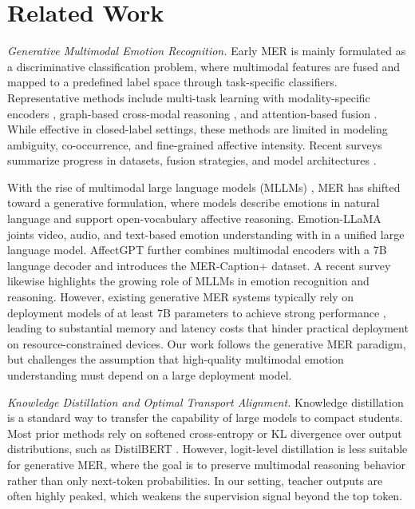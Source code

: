\documentclass[sigconf]{acmart}
\begin{document}
\section{Related Work}
\noindent \emph{Generative Multimodal Emotion Recognition.}
Early MER is mainly formulated as a discriminative classification problem, where multimodal features are fused and mapped to a predefined label space through task-specific classifiers.
Representative methods include multi-task learning with modality-specific encoders \cite{zheng-etal-2023-facial,fu2024iisan}, graph-based cross-modal reasoning \cite{Li_2023}, and attention-based fusion \cite{shi-huang-2023-multiemo}.
While effective in closed-label settings, these methods are limited in modeling ambiguity, co-occurrence, and fine-grained affective intensity.
Recent surveys summarize progress in datasets, fusion strategies, and model architectures \cite{biomimetics10070418, AV2024102218}.

With the rise of multimodal large language models (MLLMs) \cite{openai2024,yang2025,geminiteam2025,fu2025efficient,fu2026differentiable,fu2024exploring,he2025double,fu2026streamaware}, MER has shifted toward a generative formulation, where models describe emotions in natural language and support open-vocabulary affective reasoning.
Emotion-LLaMA \cite{Emotion-LLaMA} joints video, audio, and text-based emotion understanding with in a unified large language model.
AffectGPT \cite{affectgpt} further combines multimodal encoders with a 7B language decoder and introduces the MER-Caption+ dataset.
A recent survey \cite{shou2025} likewise highlights the growing role of MLLMs in emotion recognition and reasoning.
However, existing generative MER systems typically rely on deployment models of at least 7B parameters to achieve strong performance \cite{affectgpt,Emotion-LLaMA,su2023}, leading to substantial memory and latency costs that hinder practical deployment on resource-constrained devices.
Our work follows the generative MER paradigm, but challenges the assumption that high-quality multimodal emotion understanding must depend on a large deployment model.


\noindent \emph{Knowledge Distillation and Optimal Transport Alignment.}
Knowledge distillation \cite{hinton2015} is a standard way to transfer the capability of large models to compact students.
Most prior methods \cite{gu2026mini,agarwal2024} rely on softened cross-entropy or KL divergence over output distributions, such as DistilBERT \cite{sanh2020}.
However, logit-level distillation is less suitable for generative MER, where the goal is to preserve multimodal reasoning behavior rather than only next-token probabilities.
In our setting, teacher outputs are often highly peaked, which weakens the supervision signal beyond the top token.
\end{document}
